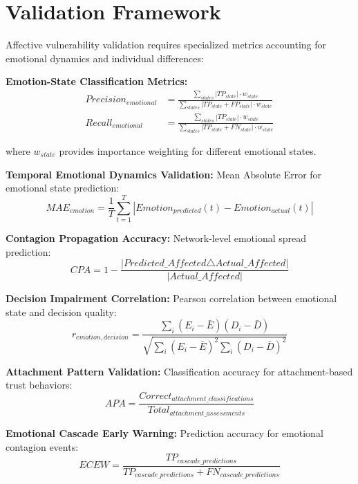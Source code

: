 \documentclass[11pt,a4paper]{article}
\begin{document}
\section{Validation Framework}

Affective vulnerability validation requires specialized metrics accounting for emotional dynamics and individual differences:

\textbf{Emotion-State Classification Metrics:}
\begin{align}
Precision_{emotional} &= \frac{\sum_{states} |TP_{state}| \cdot w_{state}}{\sum_{states} |TP_{state} + FP_{state}| \cdot w_{state}} \\
Recall_{emotional} &= \frac{\sum_{states} |TP_{state}| \cdot w_{state}}{\sum_{states} |TP_{state} + FN_{state}| \cdot w_{state}}
\end{align}

where $w_{state}$ provides importance weighting for different emotional states.

\textbf{Temporal Emotional Dynamics Validation:}
Mean Absolute Error for emotional state prediction:
\begin{equation}
MAE_{emotion} = \frac{1}{T} \sum_{t=1}^{T} |Emotion_{predicted}(t) - Emotion_{actual}(t)|
\end{equation}

\textbf{Contagion Propagation Accuracy:}
Network-level emotional spread prediction:
\begin{equation}
CPA = 1 - \frac{|Predicted\_Affected \triangle Actual\_Affected|}{|Actual\_Affected|}
\end{equation}

\textbf{Decision Impairment Correlation:}
Pearson correlation between emotional state and decision quality:
\begin{equation}
r_{emotion,decision} = \frac{\sum_{i}(E_i - \bar{E})(D_i - \bar{D})}{\sqrt{\sum_{i}(E_i - \bar{E})^2 \sum_{i}(D_i - \bar{D})^2}}
\end{equation}

\textbf{Attachment Pattern Validation:}
Classification accuracy for attachment-based trust behaviors:
\begin{equation}
APA = \frac{Correct_{attachment\_classifications}}{Total_{attachment\_assessments}}
\end{equation}

\textbf{Emotional Cascade Early Warning:}
Prediction accuracy for emotional contagion events:
\begin{equation}
ECEW = \frac{TP_{cascade\_predictions}}{TP_{cascade\_predictions} + FN_{cascade\_predictions}}
\end{equation}
\end{document}

